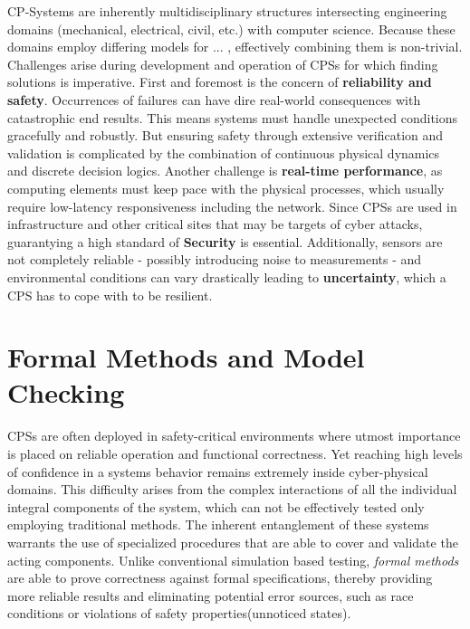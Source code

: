 CP-Systems are inherently multidisciplinary structures intersecting engineering domains (mechanical, electrical, civil, etc.) with computer science.
Because these domains employ differing models for ... , effectively combining them is non-trivial. Challenges arise during development and operation of CPSs for which
finding solutions is imperative. \cite{cpsChallengesAndFuture} First and foremost is the concern of \textbf{reliability and safety}. Occurrences of failures can have dire real-world
consequences with catastrophic end results. This means systems must handle unexpected conditions gracefully and robustly. But ensuring safety through extensive verification
and validation is complicated by the combination of continuous physical dynamics and discrete decision logics. Another challenge is \textbf{real-time performance}, as computing
elements must keep pace with the physical processes, which usually require low-latency responsiveness including the network. Since CPSs are used in infrastructure and other
critical sites that may be targets of cyber attacks, guarantying a high standard of \textbf{Security} is essential. Additionally, sensors are not completely reliable -
possibly introducing noise to measurements - and environmental conditions can vary drastically leading to \textbf{uncertainty}, which a CPS has to cope with to be resilient. \cite{cpsProbabilisticRobotics}

\label{sec:formal-methods}
\section{Formal Methods and Model Checking}

CPSs are often deployed in safety-critical environments where utmost importance is placed on reliable operation and functional correctness. Yet reaching high levels of confidence
in a systems behavior remains extremely inside cyber-physical domains.\cite{formalMethodsCPSCritical} This difficulty arises from the complex interactions of all the individual integral
components of the system, which can not be effectively tested only employing traditional methods. The inherent entanglement of these systems warrants the use of
specialized procedures that are able to cover and validate the acting components. Unlike conventional simulation based testing, \textit{formal methods} are able to prove correctness against
formal specifications, thereby providing more reliable results and eliminating potential error sources, such as race conditions or violations of safety properties(unnoticed states).

